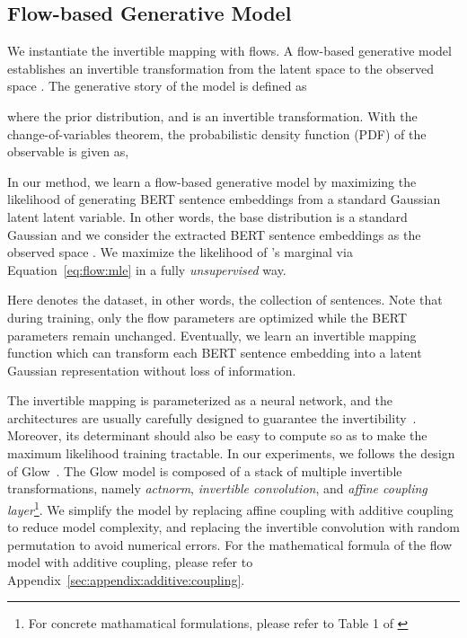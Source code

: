 \documentclass[11pt,a4paper]{article}
\begin{document}
\subsection{Flow-based Generative Model}



We instantiate the invertible mapping with flows. A flow-based generative model~\cite{kobyzev2019normalizing} establishes an invertible transformation from the latent space  to the observed space . The generative story of the model is defined as

where  the prior distribution, and  is an invertible transformation. With the change-of-variables theorem, the probabilistic density function (PDF) of the observable  is given as, 


In our method, we learn a flow-based generative model
by maximizing the likelihood of generating BERT sentence embeddings from a standard Gaussian latent latent variable. In other words, the base distribution  is a standard Gaussian and we consider the extracted BERT sentence embeddings as the observed space . We maximize the likelihood of 's marginal via Equation~\ref{eq:flow:mle} in a fully \emph{unsupervised} way.

Here  denotes the dataset, in other words, the collection of sentences. Note that during training, only the flow parameters are optimized while the BERT parameters remain unchanged. Eventually, we learn an invertible mapping function  which can transform each BERT sentence embedding  into a latent Gaussian representation  without loss of information.

The invertible mapping  is parameterized as a neural network, and the architectures are usually carefully designed to guarantee the invertibility~\cite{dinh2014nice}. Moreover, its determinant   should also be easy to compute so as to make the maximum likelihood training tractable. In our experiments, we follows the design of Glow~\cite{kingma2018glow}. The Glow model is composed of a stack of multiple invertible transformations, namely \textit{actnorm}, \textit{invertible  convolution}, and \textit{affine coupling layer}\footnote{For concrete mathamatical formulations, please refer to Table 1 of \citet{kingma2018glow}}.
We simplify the model by replacing affine coupling with additive coupling~\cite{dinh2014nice} to reduce model complexity, and replacing the invertible  convolution with random permutation to avoid numerical errors. For the mathematical formula of the flow model with additive coupling, please refer to Appendix~\ref{sec:appendix:additive:coupling}.
\end{document}
